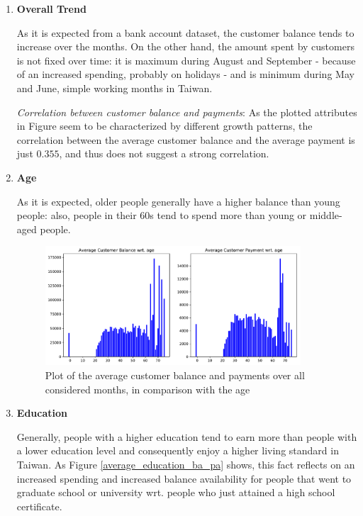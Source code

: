 \documentclass[a4paper]{article}
\begin{document}
\begin{enumerate}

\item{\textbf{Overall Trend}}

As it is expected from a bank account dataset, the customer balance tends to increase over the months. On the other hand, the amount spent by customers is not fixed over time: it is maximum during August and September - because of an increased spending, probably on holidays - and is minimum during May and June, simple working months in Taiwan. 

\textit{Correlation between customer balance and payments}: As the plotted attributes in Figure \label{average_months} seem to be characterized by different growth patterns, the correlation between the average customer balance and the average payment is just $0.355$, and thus does not suggest a strong correlation. 




\item \textbf{Age}

As it is expected, older people generally have a higher balance than young people: also, people in their 60s tend to spend more than young or middle-aged people. 

\begin{center}
\begin{figure}

\includegraphics[width=0.9\textwidth]{../Code/Daniele/Plots/age_plot.pdf}
\caption{Plot of the average customer balance and payments over all considered months, in comparison with the age }
\label{average_months}

\end{figure}
\end{center}

\item \textbf{Education}

Generally, people with a higher education tend to earn more than people with a lower education level and consequently enjoy a higher living standard in Taiwan. As Figure \ref{average_education_ba_pa} shows, this fact reflects on an increased spending and increased balance availability for people that went to graduate school or university wrt. people who just attained a high school certificate. 



\end{enumerate}
\end{document}
